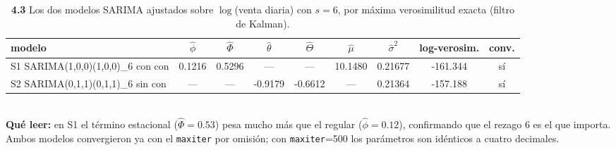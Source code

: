\begin{table}[htbp]
\centering
\footnotesize
\caption{\textbf{4.3} Los dos modelos SARIMA ajustados sobre $\log$(venta diaria) con $s=6$, por m\'axima verosimilitud exacta (filtro de Kalman).}
\label{tab:p4_sarima}
\begin{tabular}{lcccccccc}
\toprule
\textbf{modelo} & \textbf{$\hat\phi$} & \textbf{$\hat\Phi$} & \textbf{$\hat\theta$} & \textbf{$\hat\Theta$} & \textbf{$\hat\mu$} & \textbf{$\hat\sigma^2$} & \textbf{log-verosim.} & \textbf{conv.} \\
\midrule
S1  SARIMA(1,0,0)(1,0,0)\_6 con con & 0.1216 & 0.5296 & --- & --- & 10.1480 & 0.21677 & -161.344 & s\'i \\
S2  SARIMA(0,1,1)(0,1,1)\_6 sin con & --- & --- & -0.9179 & -0.6612 & --- & 0.21364 & -157.188 & s\'i \\
\bottomrule
\end{tabular}
\\[0.3em]{\scriptsize \textbf{Qu\'e leer:} en S1 el t\'ermino estacional ($\hat\Phi=0.53$) pesa mucho m\'as que el regular ($\hat\phi=0.12$), confirmando que el rezago 6 es el que importa. Ambos modelos convergieron ya con el \texttt{maxiter} por omisi\'on; con \texttt{maxiter}=500 los par\'ametros son id\'enticos a cuatro decimales.}
\end{table}
